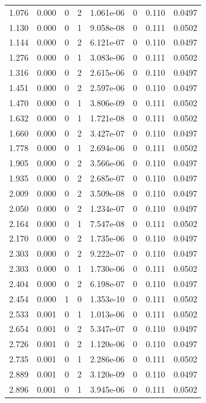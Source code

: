 \documentclass[preview]{standalone}
\begin{document}
{{\begin{tabular}{L{1.2cm}C{1.2cm} C{0.3cm}C{0.5cm} C{1.4cm}C{1.4cm} C{1.4cm}C{1.4cm}}
  1.076  &  0.000  & 0     &  2 &  1.061e-06  & 0  & 0.110 &  0.0497   \\ 
  1.130  &  0.000  & 0     &  1 &  9.058e-08  & 0  & 0.111 &  0.0502   \\ 
  1.144  &  0.000  & 0     &  2 &  6.121e-07  & 0  & 0.110 &  0.0497   \\ 
  1.276  &  0.000  & 0     &  1 &  3.083e-06  & 0  & 0.111 &  0.0502   \\ 
  1.316  &  0.000  & 0     &  2 &  2.615e-06  & 0  & 0.110 &  0.0497   \\ 
  1.451  &  0.000  & 0     &  2 &  2.597e-06  & 0  & 0.110 &  0.0497   \\ 
  1.470  &  0.000  & 0     &  1 &  3.806e-09  & 0  & 0.111 &  0.0502   \\ 
  1.632  &  0.000  & 0     &  1 &  1.721e-08  & 0  & 0.111 &  0.0502   \\ 
  1.660  &  0.000  & 0     &  2 &  3.427e-07  & 0  & 0.110 &  0.0497   \\ 
  1.778  &  0.000  & 0     &  1 &  2.694e-06  & 0  & 0.111 &  0.0502   \\ 
  1.905  &  0.000  & 0     &  2 &  3.566e-06  & 0  & 0.110 &  0.0497   \\ 
  1.935  &  0.000  & 0     &  2 &  2.685e-07  & 0  & 0.110 &  0.0497   \\ 
  2.009  &  0.000  & 0     &  2 &  3.509e-08  & 0  & 0.110 &  0.0497   \\ 
  2.050  &  0.000  & 0     &  2 &  1.234e-07  & 0  & 0.110 &  0.0497   \\ 
  2.164  &  0.000  & 0     &  1 &  7.547e-08  & 0  & 0.111 &  0.0502   \\ 
  2.170  &  0.000  & 0     &  2 &  1.735e-06  & 0  & 0.110 &  0.0497   \\ 
  2.303  &  0.000  & 0     &  2 &  9.222e-07  & 0  & 0.110 &  0.0497   \\ 
  2.303  &  0.000  & 0     &  1 &  1.730e-06  & 0  & 0.111 &  0.0502   \\ 
  2.404  &  0.000  & 0     &  2 &  6.198e-07  & 0  & 0.110 &  0.0497   \\ 
  2.454  &  0.000  & 1     &  0 &  1.353e-10  & 0  & 0.111 &  0.0502   \\ 
  2.533  &  0.001  & 0     &  1 &  1.013e-06  & 0  & 0.111 &  0.0502   \\ 
  2.654  &  0.001  & 0     &  2 &  5.347e-07  & 0  & 0.110 &  0.0497   \\ 
  2.726  &  0.001  & 0     &  2 &  1.120e-06  & 0  & 0.110 &  0.0497   \\ 
  2.735  &  0.001  & 0     &  1 &  2.286e-06  & 0  & 0.111 &  0.0502   \\ 
  2.889  &  0.001  & 0     &  2 &  3.120e-09  & 0  & 0.110 &  0.0497   \\ 
  2.896  &  0.001  & 0     &  1 &  3.945e-06  & 0  & 0.111 &  0.0502   \\ 
\hline 
\end{tabular} 

}}
\end{document}
